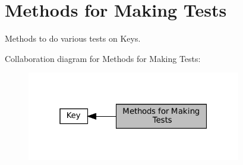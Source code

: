 \hypertarget{group__keytest}{}\section{Methods for Making Tests}
\label{group__keytest}


Methods to do various tests on Keys.  


Collaboration diagram for Methods for Making Tests\+:
\nopagebreak
\begin{figure}[H]
\begin{center}
\leavevmode
\includegraphics[width=265pt]{group__keytest}
\end{center}
\end{figure}
